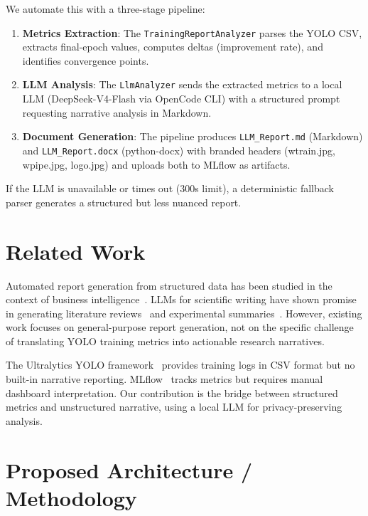 \documentclass[10pt,twocolumn,letterpaper]{article}
\begin{document}
We automate this with a three-stage pipeline:

\begin{enumerate}
    \item \textbf{Metrics Extraction}: The \texttt{TrainingReportAnalyzer} parses the YOLO CSV, extracts final-epoch values, computes deltas (improvement rate), and identifies convergence points.
    \item \textbf{LLM Analysis}: The \texttt{LlmAnalyzer} sends the extracted metrics to a local LLM (DeepSeek-V4-Flash via OpenCode CLI) with a structured prompt requesting narrative analysis in Markdown.
    \item \textbf{Document Generation}: The pipeline produces \texttt{LLM\_Report.md} (Markdown) and \texttt{LLM\_Report.docx} (python-docx) with branded headers (wtrain.jpg, wpipe.jpg, logo.jpg) and uploads both to MLflow as artifacts.
\end{enumerate}

If the LLM is unavailable or times out (300s limit), a deterministic fallback parser generates a structured but less nuanced report.

\section{Related Work}
Automated report generation from structured data has been studied in the context of business intelligence~\cite{li2023automated}. LLMs for scientific writing have shown promise in generating literature reviews~\cite{qian2024scillm} and experimental summaries~\cite{van2024autoscience}. However, existing work focuses on general-purpose report generation, not on the specific challenge of translating YOLO training metrics into actionable research narratives.

The Ultralytics YOLO framework~\cite{jocher2023yolo} provides training logs in CSV format but no built-in narrative reporting. MLflow~\cite{mlflow2024} tracks metrics but requires manual dashboard interpretation. Our contribution is the bridge between structured metrics and unstructured narrative, using a local LLM for privacy-preserving analysis.

\section{Proposed Architecture / Methodology}
\end{document}
